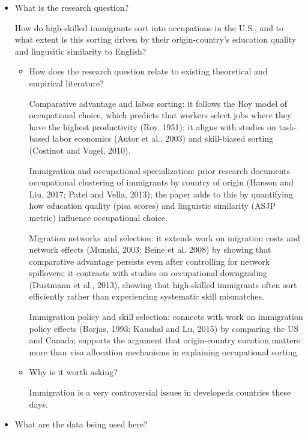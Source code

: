 \documentclass{article}
\begin{document}
\begin{itemize}
    \item What is the research question?
    
    How do high-skilled immigrants sort into occupations in the U.S., and to what extent is this sorting driven by their origin-country's education quality and lingusitic similarity to English?
    
    \begin{itemize}
        \item How does the research question relate to existing theoretical and empirical literature?
        
        Comparative advantage and labor sorting: it follows the Roy model of occupational choice, which predicts that workers select jobs where they have the highest productivity (Roy, 1951); it aligns with studies on task-based labor economics (Autor et al., 2003) and skill-biased sorting (Costinot and Vogel, 2010).
        
        Immigration and occupational specialization: prior research documents occupational clustering of immigrants by country of origin (Hanson and Liu, 2017; Patel and Vella, 2013); the paper adds to this by quantifying how education quality (pisa scores) and linguistic similarity (ASJP metric) influence occupational choice.

        Migration networks and selection: it extends work on migration costs and network effects (Munshi, 2003; Beine et al. 2008) by showing that comparative advantage persists even after controlling for network spillovers; it contrasts with studies on occupational downgrading (Dustmann et al., 2013), showing that high-skilled immigrants often sort efficiently rather than experiencing systematic skill mismatches.

        Immigration policy and skill selection: connects with work on immigration policy effects (Borjas, 1993; Kaushal and Lu, 2015) by comparing the US and Canada; supports the argument that origin-country eucation matters more than visa allocation mechanisms in explaining occupational sorting.

        \item Why is it worth asking?
    
        Immigration is a very controversial issues in developeds countries these days.

    \end{itemize}
    \item What are the data being used here?
    

\end{itemize}
\end{document}
